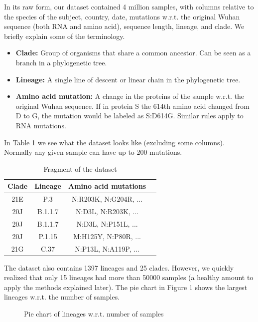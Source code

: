 \documentclass[twoside,twocolumn]{article}
\begin{document}
	In its raw form, our dataset contained 4 million samples, with columns relative to the species of the subject, country, date, mutations w.r.t. the original Wuhan sequence (both RNA and amino acid), sequence length, lineage, and clade. We briefly explain some of the terminology.
	\begin{itemize}
		\item \textbf{Clade: }Group of organisms that share a common ancestor. Can be seen as a branch in a phylogenetic tree.
		\item \textbf{Lineage: } A single line of descent or linear chain in the phylogenetic tree.
		\item \textbf{Amino acid mutation: } A change in the proteins of the sample w.r.t. the original Wuhan sequence. If in protein S the 614th amino acid changed from D to G, the mutation would be labeled as S:D614G. Similar rules apply to RNA mutations\cite{nomenclature}.
	\end{itemize}
	In Table 1 we see what the dataset looks like (excluding some columns). Normally any given sample can have up to 200 mutations. 
	\begin{table}
		\caption{Fragment of the dataset}
		\centering
		\renewcommand{\arraystretch}{1.2} %
		\begin{tabular}{|c|c|c|c|}
			\hline
			Clade & Lineage & Amino acid mutations \\
			\hline
			21E  & P.3& N:R203K, N:G204R, ... \\
			20J & B.1.1.7 & N:D3L, N:R203K, ...\\
			20J & B.1.1.7 & N:D3L, N:P151L, ...\\
			20J & P.1.15 & M:H125Y, N:P80R, ...\\
			21G & C.37 & N:P13L, N:A119P, ...\\
			\hline
		\end{tabular}
	\end{table}
	The dataset also contains 1397 lineages and 25 clades. However, we quickly realized that only 15 lineages had more than 50000 samples (a healthy amount to apply the methods explained later). The pie chart in Figure 1 shows the largest lineages w.r.t. the number of samples. 
	\begin{figure}
		\caption{Pie chart of lineages w.r.t. number of samples} \label{piechart}
	\end{figure}
\end{document}
